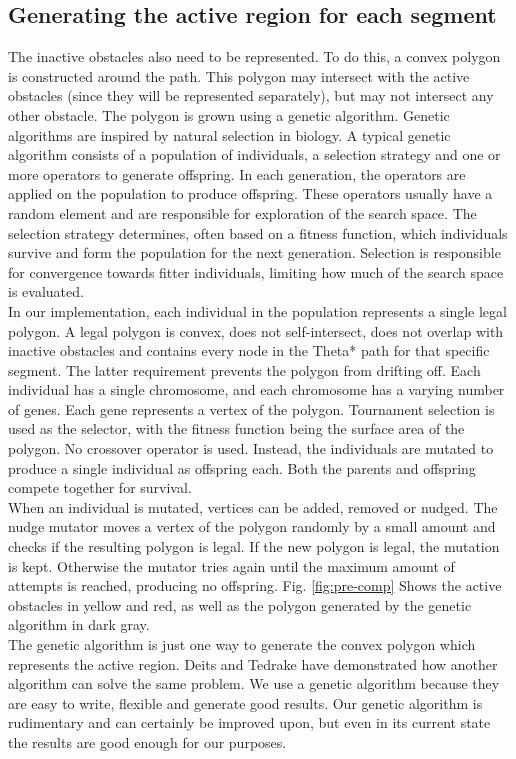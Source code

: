 \subsection{Generating the active region for each segment}
The inactive obstacles also need to be represented. To do this, a convex polygon is constructed around the path. This polygon may intersect with the active obstacles (since they will be represented separately), but may not intersect any other obstacle. The polygon is grown using a genetic algorithm. Genetic algorithms are inspired by natural selection in biology. A typical genetic algorithm consists of a population of individuals, a selection strategy and one or more operators to generate offspring. In each generation, the operators are applied on the population to produce offspring. These operators usually have a random element and are responsible for exploration of the search space. The selection strategy determines, often based on a fitness function, which individuals survive and form the population for the next generation. Selection is responsible for convergence towards fitter individuals, limiting how much of the search space is evaluated. \\
In our implementation, each individual in the population represents a single legal polygon. A legal polygon is convex, does not self-intersect, does not overlap with inactive obstacles and contains every node in the Theta* path for that specific segment. The latter requirement prevents the polygon from drifting off. Each individual has a single chromosome, and each chromosome has a varying number of genes. Each gene represents a vertex of the polygon. Tournament selection is used as the selector, with the fitness function being the surface area of the polygon. No crossover operator is used. Instead, the individuals are mutated to produce a single individual as offspring each. Both the parents and offspring compete together for survival. \\
When an individual is mutated, vertices can be added, removed or nudged. The nudge mutator moves a vertex of the polygon randomly by a small amount and checks if the resulting polygon is legal. If the new polygon is legal, the mutation is kept. Otherwise the mutator tries again until the maximum amount of attempts is reached, producing no offspring.  Fig. \ref{fig:pre-comp} Shows the active obstacles in yellow and red, as well as the polygon generated by the genetic algorithm in dark gray.\\
The genetic algorithm is just one way to generate the convex polygon which represents the active region. Deits and Tedrake \cite{Deits2015} have demonstrated how another algorithm can solve the same problem. We use a genetic algorithm because they are easy to write, flexible and generate good results. Our genetic algorithm is rudimentary and can certainly be improved upon, but even in its current state the results are good enough for our purposes.
